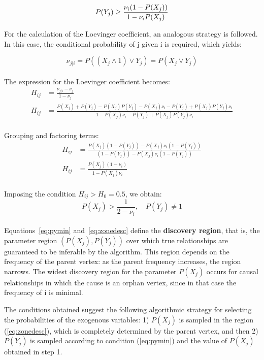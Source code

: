\documentclass[12pt,a4paper]{report}
\begin{document}
\begin{equation}
\label{eq:pymin}
P(Y_j) \geq \frac{\nu_i (1 - P(X_j))}{1 - \nu_i P(X_j)} \\
\end{equation}


For the calculation of the Loevinger coefficient, an analogous strategy is followed. In this case, the conditional probability of j given i is required, which yields:

\begin{equation}
\nu_{j|i} = P((X_j \land 1) \lor Y_j) = P(X_j \lor Y_j) 
\end{equation}
\\
The expression for the Loevinger coefficient becomes:
\begin{align*}
H_{ij} &= \frac{\nu_{j|i} - \nu_j}{1 - \nu_j} \\
H_{ij} &= \frac{P(X_j) + P(Y_j) - P(X_j)P(Y_j) - P(X_j) \nu_i - P(Y_j) + P(X_j) P(Y_j) \nu_i}{1 - P(X_j) \nu_i - P(Y_j) + P(X_j) P(Y_j) \nu_i}
\end{align*}
\\
Grouping and factoring terms:
\begin{align*}
H_{ij} &= \frac{P(X_j)(1 - P(Y_j)) - P(X_j) \nu_i (1 - P(Y_j))}{(1 - P(Y_j)) - P(X_j) \nu_i (1 - P(Y_j))} \\ 
H_{ij} &= \frac{P(X_j)(1 - \nu_i)}{1 - P(X_j) \nu_i}
\end{align*}
\\
Imposing the condition \( H_{ij} > H_0 = 0.5 \), we obtain:
\begin{equation}
\label{eq:zonedesc}
P(X_j) > \frac{1}{2 - \nu_{i}}, \quad P(Y_j) \neq 1
\end{equation}
\\

Equations~\ref{eq:pymin} and~\ref{eq:zonedesc} define the \textbf{discovery region}, that is, the parameter region \( (P(X_j), P(Y_j)) \) over which true relationships are guaranteed to be inferable by the algorithm. This region depends on the frequency of the parent vertex: as the parent frequency increases, the region narrows. The widest discovery region for the parameter $P(X_j)$ occurs for causal relationships in which the cause is an orphan vertex, since in that case the frequency of i is minimal.


The conditions obtained suggest the following algorithmic strategy for selecting the probabilities of the exogenous variables: 1) $P(X_j)$ is sampled in the region (\ref{eq:zonedesc}), which is completely determined by the parent vertex, and then 2) $P(Y_j)$ is sampled according to condition (\ref{eq:pymin}) and the value of $P(X_j)$ obtained in step 1.
\end{document}
